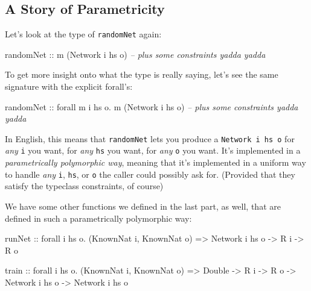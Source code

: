 \documentclass[]{article}
\newenvironment{Shaded}{}{}
\newcommand{\DataTypeTok}[1]{\textcolor[rgb]{0.56,0.13,0.00}{{#1}}}
\newcommand{\CommentTok}[1]{\textcolor[rgb]{0.38,0.63,0.69}{\textit{{#1}}}}
\newcommand{\OtherTok}[1]{\textcolor[rgb]{0.00,0.44,0.13}{{#1}}}
\newcommand{\FunctionTok}[1]{\textcolor[rgb]{0.02,0.16,0.49}{{#1}}}
\newcommand{\NormalTok}[1]{{#1}}
\begin{document}
\subsection{A Story of Parametricity}\label{a-story-of-parametricity}

Let's look at the type of \texttt{randomNet} again:

\begin{Shaded}
\begin{Highlighting}[]
\OtherTok{randomNet ::} \NormalTok{m (}\DataTypeTok{Network} \NormalTok{i hs o)}
             \CommentTok{-- plus some constraints yadda yadda}
\end{Highlighting}
\end{Shaded}

To get more insight onto what the type is really saying, let's see the same
signature with the explicit forall's:

\begin{Shaded}
\begin{Highlighting}[]
\OtherTok{randomNet ::} \NormalTok{forall m i hs o}\FunctionTok{.} \NormalTok{m (}\DataTypeTok{Network} \NormalTok{i hs o)}
             \CommentTok{-- plus some constraints yadda yadda}
\end{Highlighting}
\end{Shaded}

In English, this means that \texttt{randomNet} lets you produce a
\texttt{Network\ i\ hs\ o} for \emph{any} \texttt{i} you want, for \emph{any}
\texttt{hs} you want, for \emph{any} \texttt{o} you want. It's implemented in a
\emph{parametrically polymorphic way}, meaning that it's implemented in a
uniform way to handle \emph{any} \texttt{i}, \texttt{hs}, or \texttt{o} the
caller could possibly ask for. (Provided that they satisfy the typeclass
constraints, of course)

We have some other functions we defined in the last part, as well, that are
defined in such a parametrically polymorphic way:

\begin{Shaded}
\begin{Highlighting}[]
\OtherTok{runNet ::} \NormalTok{forall i hs o}\FunctionTok{.} \NormalTok{(}\DataTypeTok{KnownNat} \NormalTok{i, }\DataTypeTok{KnownNat} \NormalTok{o)}
       \OtherTok{=>} \DataTypeTok{Network} \NormalTok{i hs o}
       \OtherTok{->} \DataTypeTok{R} \NormalTok{i}
       \OtherTok{->} \DataTypeTok{R} \NormalTok{o}

\OtherTok{train  ::} \NormalTok{forall i hs o}\FunctionTok{.} \NormalTok{(}\DataTypeTok{KnownNat} \NormalTok{i, }\DataTypeTok{KnownNat} \NormalTok{o)}
       \OtherTok{=>} \DataTypeTok{Double}
       \OtherTok{->} \DataTypeTok{R} \NormalTok{i}
       \OtherTok{->} \DataTypeTok{R} \NormalTok{o}
       \OtherTok{->} \DataTypeTok{Network} \NormalTok{i hs o}
       \OtherTok{->} \DataTypeTok{Network} \NormalTok{i hs o}
\end{Highlighting}
\end{Shaded}
\end{document}
